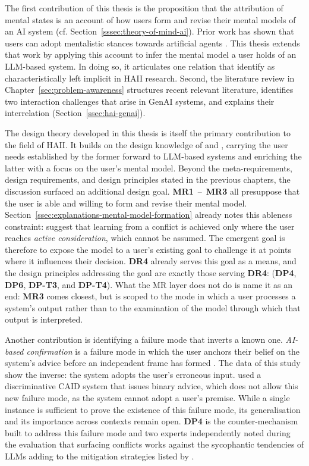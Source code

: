 The first contribution of this thesis is the proposition that the attribution of mental states is an account of how users form and revise their mental models of an \ac{AI} system (cf. Section~\ref{sssec:theory-of-mind-ai}). Prior work has shown that users can adopt mentalistic stances towards artificial agents \parencite{PerezOsorio2020}. This thesis extends that work by applying this account to infer the mental model a user holds of an \ac{LLM}-based system. In doing so, it articulates one relation that \textcite{Bodamer2026} identify as characteristically left implicit in \ac{HAII} research. Second, the literature review in Chapter~\ref{sec:problem-awareness} structures recent relevant literature, identifies two interaction challenges that arise in \ac{GenAI} systems, and explains their interrelation (Section~\ref{ssec:hai-genai}).

The design theory developed in this thesis is itself the primary contribution to the field of \ac{HAII}. It builds on the design knowledge of \textcite{Amershi2019} and \textcite{Weisz2025}, carrying the user needs established by the former forward to \ac{LLM}-based systems and enriching the latter with a focus on the user's mental model. Beyond the meta-requirements, design requirements, and design principles stated in the previous chapters, the discussion surfaced an additional design goal. \textbf{MR1}~--~\textbf{MR3} all presuppose that the user is able and willing to form and revise their mental model. Section~\ref{ssec:explanations-mental-model-formation} already notes this ableness constraint: \textcite{Jussupow2021} suggest that learning from a conflict is achieved only where the user reaches \textit{active consideration}, which cannot be assumed. The emergent goal is therefore to expose the model to a user's existing goal to challenge it at points where it influences their decision. \textbf{DR4} already serves this goal as a means, and the design principles addressing the goal are exactly those serving \textbf{DR4}: (\textbf{DP4}, \textbf{DP6}, \textbf{DP-T3}, and \textbf{DP-T4}). What the \ac{MR} layer does not do is name it as an end: \textbf{MR3} comes closest, but is scoped to the mode in which a user processes a system's output rather than to the examination of the model through which that output is interpreted.

Another contribution is identifying a failure mode that inverts a known one. \textit{AI-based confirmation} is a failure mode in which the user anchors their belief on the system's advice before an independent frame has formed \parencite{Jussupow2021}. The data of this study show the inverse: the system adopts the user's erroneous input. \textcite{Jussupow2021} used a discriminative \ac{CAID}  system that issues binary advice, which does not allow this new failure mode, as the system cannot adopt a user's premise. While a single instance is sufficient to prove the existence of this failure mode, its generalisation and its importance across contexts remain open. \textbf{DP4} is the counter-mechanism built to address this failure mode and two experts independently noted during the evaluation that surfacing conflicts works against the sycophantic tendencies of \acp{LLM} adding to the mitigation strategies listed by \textcite{Sharma2024}.

